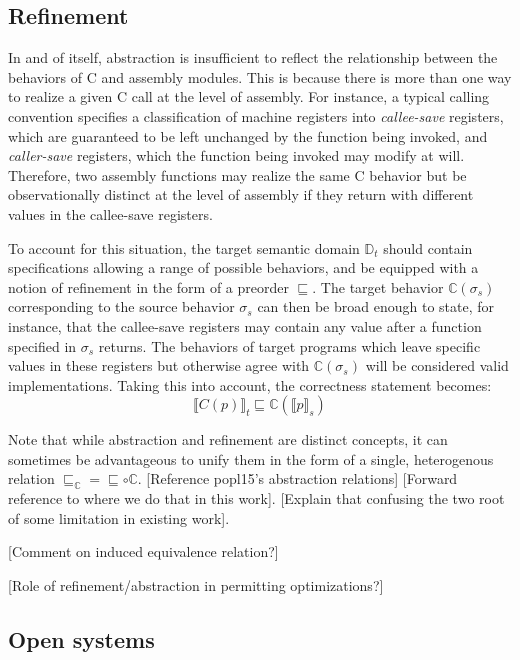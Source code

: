 \documentclass[sigplan,10pt,review,anonymous]{acmart}
\begin{document}

\subsection{Refinement} %

In and of itself,
abstraction is insufficient to reflect
the relationship between the behaviors of C and assembly modules.
This is because there is more than one way to realize
a given C call at the level of assembly.
For instance,
a typical calling convention specifies a classification of machine registers
into \emph{callee-save} registers,
which are guaranteed to be left unchanged by the function being invoked,
and \emph{caller-save} registers,
which the function being invoked may modify at will.
Therefore,
two assembly functions may realize the same C behavior
but be observationally distinct at the level of assembly
if they return with different values in the callee-save registers.

To account for this situation,
the target semantic domain $\mathbb{D}_t$
should contain specifications
allowing a range of possible behaviors,
and be equipped with a notion of refinement
in the form of a preorder $\sqsubseteq$.
The target behavior $\mathbb{C}(\sigma_s)$
corresponding to the source behavior $\sigma_s$
can then be broad enough to state,
for instance,
that the callee-save registers
may contain any value after a function
specified in $\sigma_s$ returns.
The behaviors of target programs
which leave specific values in these registers
but otherwise agree with $\mathbb{C}(\sigma_s)$
will be considered valid implementations.
Taking this into account,
the correctness statement becomes:
\[ \llbracket C(p) \rrbracket_t \sqsubseteq
    \mathbb{C}(\llbracket p \rrbracket_s) \]

Note that while abstraction and refinement are distinct concepts,
it can sometimes be advantageous to unify them
in the form of a single, heterogenous relation
${\sqsubseteq_\mathbb{C}} = {\sqsubseteq} \circ {\mathbb{C}}$.
[Reference popl15's abstraction relations]
[Forward reference to where we do that in this work].
[Explain that confusing the two root of some limitation
in existing work].

[Comment on induced equivalence relation?]

[Role of refinement/abstraction in permitting optimizations?]


\subsection{Open systems} %
\end{document}
